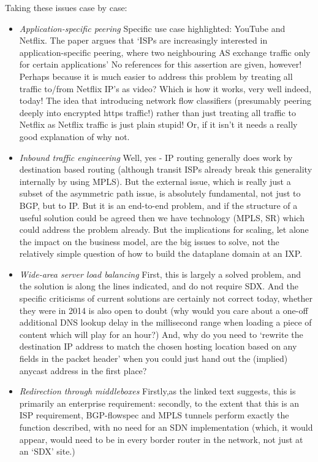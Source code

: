 Taking these issues case by case:
\begin{itemize}[noitemsep,nolistsep]
	\item{\emph{Application-specific peering}
	            Specific use case highlighted: YouTube and Netflix.
	            The paper argues that `ISPs are increasingly interested in application-specific peering, where two neighbouring AS exchange traffic only for certain applications' No references for this assertion are given, however!  Perhaps because it is much easier to address this problem by treating all traffic to/from Netflix IP's as video?  Which is how it works, very well indeed, today!  The idea that introducing network flow classifiers (presumably peering deeply into encrypted https traffic!) rather than just treating all traffic to Netflix as Netflix traffic is just plain stupid!  Or, if it isn't it needs a really good explanation of why not.}
	\item{\emph{Inbound traffic engineering}
	            Well, yes - IP routing generally does work by destination based routing (although transit ISPs already break this generality internally by using MPLS).
	            But the external issue, which is really just a subset of the asymmetric path issue, is absolutely fundamental, not just to BGP, but to IP.
	            But it is an end-to-end problem, and if the structure of a useful solution could be agreed then we have technology (MPLS, SR) which could address the problem already.
	            But the implications for scaling, let alone the impact on the business model, are the big issues to solve, not the relatively simple question of how to build the dataplane domain at an IXP.}
	\item{\emph{Wide-area server load balancing}
	            First, this is largely a solved problem, and the solution is along the lines indicated, and do not require SDX.
	            And the specific criticisms of current solutions are certainly not correct today, whether they were in 2014 is also open to doubt (why would you care about a one-off  additional DNS lookup delay in the millisecond range when loading a piece of content which will play for an hour?)  And, why do you need to `rewrite the destination IP address to match the chosen hosting location based on any fields in the packet header' when you could just hand out the (implied) anycast address in the first place?}
	\item{\emph{Redirection through middleboxes}
	            Firstly,as the linked text suggests, this is primarily an enterprise requirement: secondly, to the extent that this is an ISP requirement, BGP-flowspec and MPLS tunnels perform exactly the function described, with no need for an SDN implementation (which, it would appear, would need to be in every border router in the network, not just at an `SDX' site.)}
\end{itemize}

